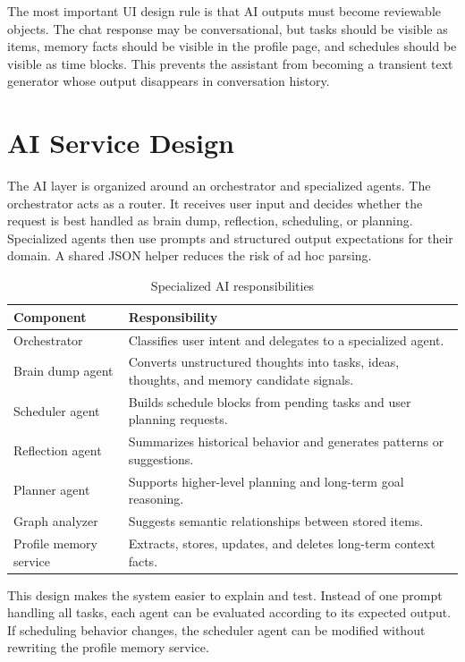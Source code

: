 The most important UI design rule is that AI outputs must become reviewable objects. The chat response may be conversational, but tasks should be visible as items, memory facts should be visible in the profile page, and schedules should be visible as time blocks. This prevents the assistant from becoming a transient text generator whose output disappears in conversation history.

\section{AI Service Design}

The AI layer is organized around an orchestrator and specialized agents. The orchestrator acts as a router. It receives user input and decides whether the request is best handled as brain dump, reflection, scheduling, or planning. Specialized agents then use prompts and structured output expectations for their domain. A shared JSON helper reduces the risk of ad hoc parsing.

\begin{table}[H]
\centering
\caption{Specialized AI responsibilities}
\label{tab:agent-responsibilities}
\begin{tabular}{|p{}|p{}|}
\hline
\textbf{Component} & \textbf{Responsibility}\\
\hline
Orchestrator & Classifies user intent and delegates to a specialized agent.\\
\hline
Brain dump agent & Converts unstructured thoughts into tasks, ideas, thoughts, and memory candidate signals.\\
\hline
Scheduler agent & Builds schedule blocks from pending tasks and user planning requests.\\
\hline
Reflection agent & Summarizes historical behavior and generates patterns or suggestions.\\
\hline
Planner agent & Supports higher-level planning and long-term goal reasoning.\\
\hline
Graph analyzer & Suggests semantic relationships between stored items.\\
\hline
Profile memory service & Extracts, stores, updates, and deletes long-term context facts.\\
\hline
\end{tabular}
\end{table}

This design makes the system easier to explain and test. Instead of one prompt handling all tasks, each agent can be evaluated according to its expected output. If scheduling behavior changes, the scheduler agent can be modified without rewriting the profile memory service.

